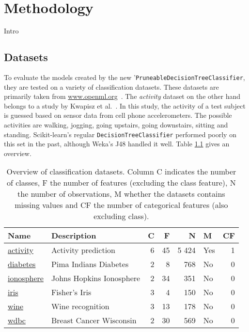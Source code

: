 \chapter{Methodology}\label{cha:method}
Intro


\section{Datasets}
To evaluate the models created by the new '\texttt{PruneableDecisionTreeClassifier}, they are tested on a variety of classification datasets. These datasets are primarily taken from \url{www.openml.org}~\cite{openml}. The \emph{activity} dataset on the other hand belongs to a study by Kwapisz et al.~\cite{problematic_dataset}. In this study, the activity of a test subject is guessed based on sensor data from cell phone accelerometers. The possible activities are walking, jogging, going upstairs, going downstairs, sitting and standing. Scikit-learn's regular \texttt{DecisionTreeClassifier} performed poorly on this set in the past, although Weka's J48 handled it well. Table \ref{tbl:datasets} gives an overview.

\begin{table}
\centering
\begin{tabular}[htp]{ l l r r r l r }
    Name & Description & C & F & N & M & CF \\ \hline
    \href{http://www.cis.fordham.edu/wisdm/dataset.php}{activity} & Activity prediction & 6 & 45 & 5 424 & Yes & 1 \\
    \href{https://www.openml.org/d/37}{diabetes} & Pima Indians Diabetes & 2 & 8 & 768 & No & 0 \\
    \href{https://www.openml.org/d/59}{ionosphere} & Johns Hopkins Ionosphere & 2 & 34 & 351 & No & 0 \\
    \href{https://www.openml.org/d/61}{iris} & Fisher's Iris & 3 & 4 & 150 & No & 0 \\
    \href{https://www.openml.org/d/187}{wine} & Wine recognition & 3 & 13 & 178 & No & 0 \\
    \href{https://www.openml.org/d/1510}{wdbc} & Breast Cancer Wisconsin & 2 & 30 & 569 & No & 0 \\
\end{tabular}
\caption{Overview of classification datasets. Column C indicates the number of classes, F the number of features (excluding the class feature), N the number of observations, M whether the datasets contains missing values and CF the number of categorical features (also excluding class).}%
\label{tbl:datasets}
\end{table}

